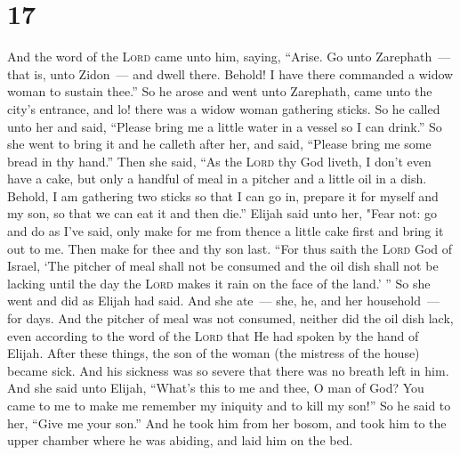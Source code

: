\section{17}\label{1 Kings 17}
\begin{enumerate}[align=center]
     And the word of the \textsc{Lord} came unto him, saying,%
     ``Arise. Go unto Zarephath~--- that is, unto Zidon~--- and dwell there. Behold! I have there commanded a widow woman to sustain thee.''%
     So he arose and went unto Zarephath, came unto the city's entrance, and lo! there was a widow woman gathering sticks. So he called unto her and said, ``Please bring me a little water in a vessel so I can drink.''%
     So she went to bring it and he calleth after her, and said, ``Please bring me some bread in thy hand.''%
     Then she said, ``As the \textsc{Lord} thy God liveth, I don't even have a cake, but only a handful of meal in a pitcher and a little oil in a dish. Behold, I am gathering two sticks so that I can go in, prepare it for myself and my son, so that we can eat it and then die.''%
     Elijah said unto her, "Fear not: go and do as I've said, only make for me from thence a little cake first and bring it out to me. Then make for thee and thy son last.%
     ``For thus saith the \textsc{Lord} God of Israel, `The pitcher of meal shall not be consumed and the oil dish shall not be lacking until the day the \textsc{Lord} makes it rain on the face of the land.' ''%
     So she went and did as Elijah had said. And she ate~--- she, he, and her household~--- for days.%
     And the pitcher of meal was not consumed, neither did the oil dish lack, even according to the word of the \textsc{Lord} that He had spoken by the hand of Elijah.%
     After these things, the son of the woman (the mistress of the house) became sick. And his sickness was so severe that there was no breath left in him.%
     And she said unto Elijah, ``What's this to me and thee, O man of God? You came to me to make me remember my iniquity and to kill my son!''%
     So he said to her, ``Give me your son.'' And he took him from her bosom, and took him to the upper chamber where he was abiding, and laid him on the bed.%

\end{enumerate}
